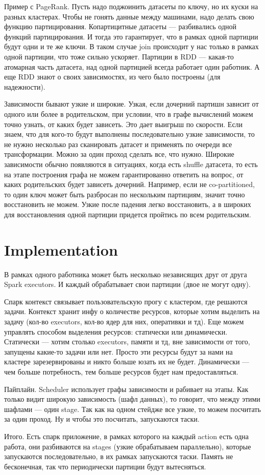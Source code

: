 Пример с PageRank. Пусть надо поджоинить датасеты по ключу, но их куски на разных кластерах. Чтобы не гонять данные между машинами, надо делать свою функцию партицирования. Копартицитные датасеты --- разбивались одной функций партицирования. И тогда это гарантирует, что в рамках одной партиции будут одни и те же ключи. В таком случае join происходит у нас только в рамках одной партиции, что тоже сильно ускоряет. Партиции в RDD --- какая-то атомарная часть датасета, над одной партицией всегда работает один работник. А еще RDD знают о своих зависимостях, из чего было построены (для надежности).

Зависимости бывают узкие и широкие. Узкая, если дочерний партишн зависит от одного или более в родительском, при условии, что в графе вычислений можем точно узнать, от каких будет зависеть. Это дает выигрыш по скорости. Если знаем, что для кого-то будут выполнены последовательно узкие зависимости, то не нужно несколько раз сканировать датасет и применять по очереди все трансформации. Можно за один проход сделать все, что нужно. Широкие зависимости обычно появляются в ситуациях, когда есть shuffle датасета, то есть на этапе построения графа не можем гарантированно ответить на вопрос, от каких родительских будет зависеть дочерний. Например, если не co-partitioned, то один ключ может быть разбросан по нескольким партициям, значит точно восстановить не можем. Узкие после падения легко восстановить, а в широких для восстановления одной партиции придется пройтись по всем родительским.
    
\section{Implementation} 

В рамках одного работника может быть несколько независящих друг от друга Spark executors. И каждый обрабатывает свои партиции (двое не могут одну). 

Спарк контекст связывает пользовательскую прогу с кластером, где решаются задачи. Контекст хранит инфу о количестве ресурсов, которые хотим выделить на задачу (кол-во executors, кол-во ядер для них, оперативки и тд). Еще можем управлять способом выделения ресурсов: статически или динамически. Статически --- хотим столько executors, памяти и тд, вне зависимости от того, запущены какие-то задачи или нет. Просто эти ресурсы будут за нами на кластере зарезервированы и никто больше юзать их не будет. Динамически --- чем больше потребность, тем больше ресурсов будет нам предоставляться.

Пайплайн. Scheduler использует графы зависимости и рабивает на этапы. Как только видит широкую зависимость (шафл данных), то говорит, что между этими шафлами --- один stage. Так как на одном стейдже все узкие, то можем посчитать за один проход. Ну и чтобы это посчитать, запускаются таски.

Итого. Есть спарк приложение, в рамках которого на каждый action есть одна работа, они разбиваются на stages (узкие обрабатываем параллельно), которые запускаются последовательно, в их рамках запускаются таски. Память не бесконечная, так что периодически партиции будут вытесняться.

